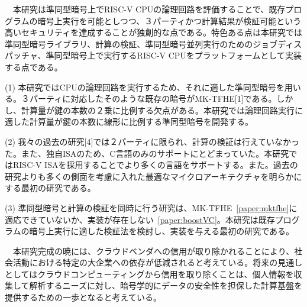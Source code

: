 　本研究は準同型暗号上でRISC-V CPUの論理回路を評価することで、既存プログラムの暗号上実行を可能としつつ、３パーティかつ計算結果が検証可能という高いセキュリティを達成することが独創的な点である。特色ある点は本研究では準同型暗号ライブラリ、計算の検証、準同型暗号並列実行のためのジョブディスパッチャ、準同型暗号上で実行するRISC-V CPUをプラットフォームとして実装する点である。


\noindent(1)	本研究ではCPUの論理回路を実行するため、それに適した準同型暗号を用いる。３パーティに対応したそのような既存の暗号がMK-TFHE[1]である。しかし、計算量が鍵の本数の２乗に比例する欠点がある。本研究では論理回路実行に適した計算量が鍵の本数に線形に比例する準同型暗号を開発する。

\noindent(2)	我々の過去の研究[4]では２パーティに限られ、計算の検証は行えていなかった。また、独自ISAのため、C言語のみのサポートにとどまっていた。本研究ではRISC-V ISAを採用することでより多くの言語をサポートする。また。過去の研究よりも多くの側面を考慮に入れた最適なマイクロアーキテクチャを明らかにする最初の研究である。

\noindent(3)	準同型暗号と計算の検証を同時に行う研究は、MK-TFHE~\ref{paper:mktfhe}に適応できていないか、実装が存在しない~\ref{paper:boostVC}。本研究は既存プログラムの暗号上実行に適した検証法を検討し、実装を与える最初の研究である。


　本研究完成の暁には、クラウドベンダへの信用が取り除かれることにより、社会活動における特定の大企業への依存が低減されると考えている。将来の見通しとしてはクラウドコンピューティングから信用を取り除くことは、個人情報を収集して解析するニーズに対し、暗号学的にデータの安全性を担保した計算基盤を提供するための一歩となると考えている。

{\footnotesize
{}  
\begin{enumerate*}[label={[\arabic*]},leftmargin=0.5cm]
    \label{paper:mktfhe}
    \label{paper:boostVC}
    \label{paper:nivc}
    \label{paper:vsp}
    \label{paper:mkgd}
    \label{paper:keylift}
\end{enumerate*}
}



